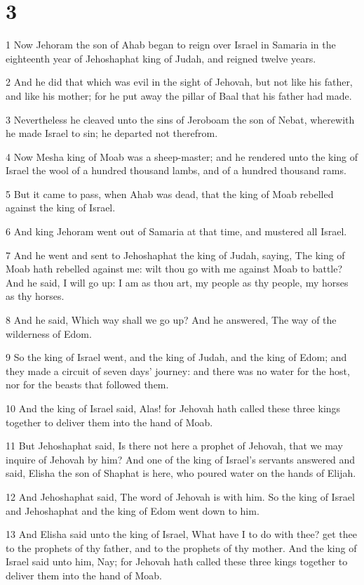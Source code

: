 \chapter{3}

\par 1 Now Jehoram the son of Ahab began to reign over Israel in Samaria in the eighteenth year of Jehoshaphat king of Judah, and reigned twelve years.
\par 2 And he did that which was evil in the sight of Jehovah, but not like his father, and like his mother; for he put away the pillar of Baal that his father had made.
\par 3 Nevertheless he cleaved unto the sins of Jeroboam the son of Nebat, wherewith he made Israel to sin; he departed not therefrom.
\par 4 Now Mesha king of Moab was a sheep-master; and he rendered unto the king of Israel the wool of a hundred thousand lambs, and of a hundred thousand rams.
\par 5 But it came to pass, when Ahab was dead, that the king of Moab rebelled against the king of Israel.
\par 6 And king Jehoram went out of Samaria at that time, and mustered all Israel.
\par 7 And he went and sent to Jehoshaphat the king of Judah, saying, The king of Moab hath rebelled against me: wilt thou go with me against Moab to battle? And he said, I will go up: I am as thou art, my people as thy people, my horses as thy horses.
\par 8 And he said, Which way shall we go up? And he answered, The way of the wilderness of Edom.
\par 9 So the king of Israel went, and the king of Judah, and the king of Edom; and they made a circuit of seven days' journey: and there was no water for the host, nor for the beasts that followed them.
\par 10 And the king of Israel said, Alas! for Jehovah hath called these three kings together to deliver them into the hand of Moab.
\par 11 But Jehoshaphat said, Is there not here a prophet of Jehovah, that we may inquire of Jehovah by him? And one of the king of Israel's servants answered and said, Elisha the son of Shaphat is here, who poured water on the hands of Elijah.
\par 12 And Jehoshaphat said, The word of Jehovah is with him. So the king of Israel and Jehoshaphat and the king of Edom went down to him.
\par 13 And Elisha said unto the king of Israel, What have I to do with thee? get thee to the prophets of thy father, and to the prophets of thy mother. And the king of Israel said unto him, Nay; for Jehovah hath called these three kings together to deliver them into the hand of Moab.
